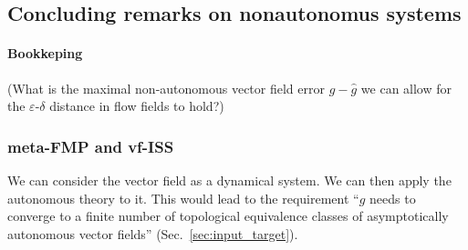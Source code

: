 \documentclass{article}
\newcommand{\ascomment}[1]{\textcolor{ascolor}{(#1)}}
\theoremstyle{definition} \newtheorem{definition}{Definition}
\theoremstyle{remark} \newtheorem{remark}{Remark}
\newcommand{\reals}{\mathbb{R}}
\newcounter{ct}
\begin{document}


%
%





    
\subsection{Concluding remarks on nonautonomus systems}

\paragraph{Bookkeping}
\ascomment{What is the maximal non-autonomous vector field error $g-\hat g$ we can allow for the $\varepsilon$-$\delta$ distance in flow fields to hold?}



\subsubsection{meta-FMP and vf-ISS}
We can consider the vector field as a dynamical system.
We can then apply the autonomous theory to it.
This would lead to the requirement ``$g$ needs to converge to a finite number of topological equivalence classes of asymptotically autonomous vector fields'' (Sec.~\ref{sec:input_target}).
\end{document}
